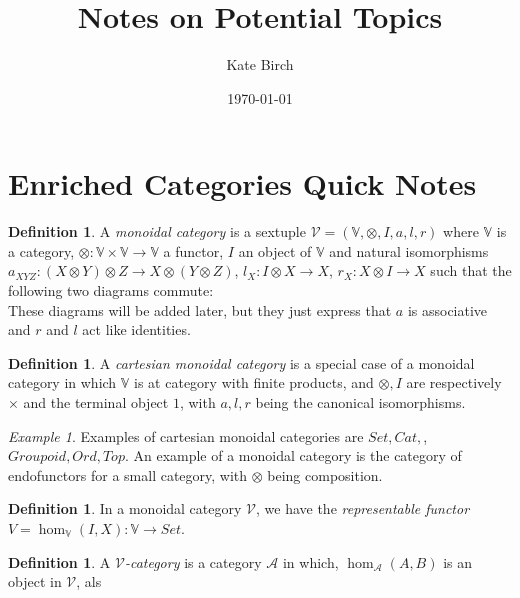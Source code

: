 \documentclass{article}
\title{Notes on Potential Topics}
\author{Kate Birch}
\date{\today}
\numberwithin{equation}{section}
\theoremstyle{definition}
\theoremstyle{definition}
\newtheorem{defn}[thm]{Definition}
\theoremstyle{remark}
\theoremstyle{remark}
\newtheorem{exa}[thm]{Example}
\begin{document}
\maketitle

\tableofcontents

\newpage


\section{Enriched Categories Quick Notes}

	\begin{defn}
		A \textit{monoidal category} is a sextuple $ \mathcal{V}= ( \mathbb{V}, \otimes, I, a, l , r)$ where $ \mathbb{V}$ is a category, $ \otimes : \mathbb{V} \times \mathbb{V} \longrightarrow \mathbb{V}$ a functor, $I$ an object of $ \mathbb{V}$ and natural isomorphisms $ a _{XYZ}: (X\otimes Y) \otimes Z \longrightarrow X \otimes (Y\otimes Z)$, $ l_X:I\otimes X \longrightarrow  X$, $r_X: X\otimes I \longrightarrow  X$ such that the following two diagrams commute: \\

		These diagrams will be added later, but they just express that $ a$ is associative and $ r$ and $ l$ act like identities.
	\end{defn}
	
	\begin{defn}
		A \textit{cartesian monoidal category} is a special case of a monoidal category in which $ \mathbb{V}$ is at category with finite products, and $ \otimes, I$ are respectively $ \times$ and the terminal object $1$, with $ a,l,r$ being the canonical isomorphisms.
	\end{defn}

	\begin{exa}
		Examples of cartesian monoidal categories are $Set, Cat, $, $Groupoid, Ord, Top$.	
		An example of a monoidal category is the category of endofunctors for a small category, with $ \otimes$ being composition.

	\end{exa}
	
	\begin{defn}
		In a monoidal category $ \mathcal{V}$, we have the \textit{representable functor} $V= \hom _{ \mathbb{V}}(I, X): \mathbb{V} \longrightarrow Set$.
	\end{defn}
		
	\begin{defn}
		A $ \mathcal{V}$\textit{-category} is a category $ \mathcal{A}$ in which,  $ \hom _{ \mathcal{A}}(A,B)$ is an object in $ \mathcal{V}$, als
	\end{defn}
	
\end{document}
